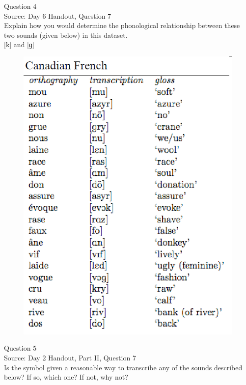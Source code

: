 \documentclass[12pt]{article}
\begin{document}
\newpage

{\large Question 4}\\

Source: Day 6 Handout, Question 7\\

Explain how you would determine the phonological relationship between these two sounds (given below) in this dataset.\\

{[k]} and {[ɡ]}

\begin{figure}[H]
\includegraphics{../images/canadianfrench.png}
\end{figure}

\newpage

{\large Question 5}\\

Source: Day 2 Handout, Part II, Question 7\\

Is the symbol given a reasonable way to transcribe any of the sounds described below? If so, which one? If not, why not?\\
\end{document}
